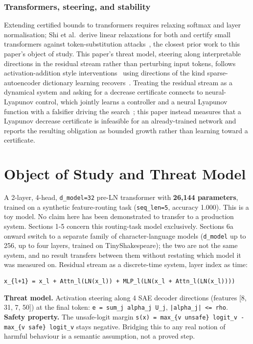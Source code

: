 \documentclass[10pt,journal]{IEEEtran}
\begin{document}
\subsubsection{Transformers, steering, and stability}
Extending certified bounds to transformers requires relaxing softmax and layer normalisation; Shi et al.\ derive linear relaxations for both and certify small transformers against token-substitution attacks~\cite{shi2020transformers}, the closest prior work to this paper's object of study. This paper's threat model, steering along interpretable directions in the residual stream rather than perturbing input tokens, follows activation-addition style interventions~\cite{turner2023actadd} using directions of the kind sparse-autoencoder dictionary learning recovers~\cite{bricken2023monosemanticity}. Treating the residual stream as a dynamical system and asking for a decrease certificate connects to neural-Lyapunov control, which jointly learns a controller and a neural Lyapunov function with a falsifier driving the search~\cite{chang2019neurallyapunov}; this paper instead measures that a Lyapunov decrease certificate is infeasible for an already-trained network and reports the resulting obligation as bounded growth rather than learning toward a certificate.

\section{Object of Study and Threat Model}
A 2-layer, 4-head, \texttt{d\_model=32} pre-LN transformer with \textbf{26,144 parameters}, trained on a synthetic feature-routing task (\texttt{seq\_len=5}, accuracy 1.000). This is a toy model. No claim here has been demonstrated to transfer to a production system.
Sections 1-5 concern this routing-task model exclusively. Sections 6a onward switch to a separate family of character-language models (\texttt{d\_model} up to 256, up to four layers, trained on TinyShakespeare); the two are not the same system, and no result transfers between them without restating which model it was measured on.
Residual stream as a discrete-time system, layer index as time:
\begin{verbatim}
x_{l+1} = x_l + Attn_l(LN(x_l)) + MLP_l(LN(x_l + Attn_l(LN(x_l))))
\end{verbatim}
\textbf{Threat model.} Activation steering along 4 SAE decoder directions (features [8, 31, 7, 50]) at the final token: \texttt{e = sum\_j alpha\_j U\_j}, \texttt{|alpha\_j| <= rho}.
\textbf{Safety property.} The unsafe-logit margin \texttt{s(x) = max\_\{v unsafe\} logit\_v - max\_\{v safe\} logit\_v} stays negative. Bridging this to any real notion of harmful behaviour is a semantic assumption, not a proved step.
\end{document}
